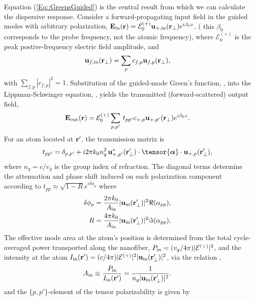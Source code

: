\documentclass[preprint,aps,pra,onecolumn]{revtex4-1} %
\newcommand{\inp}{{\rm in}}
\newcommand{\out}{{\rm out}}
\newcommand{\change}[1]{{\color{RoyalBlue} #1}}
\newcommand{\comment}[1]{{\color{Maroon} #1}}
\begin{document}
Equation (\ref{Eq::GreensGuided}) is the central result from which we can calculate the dispersive response.  
Consider a forward-propagating input field in the guided modes with arbitrary polarization, $\mathbf{E}_{\inp}(\br) = \mathcal{E}^{(+)}_0 \mathbf{u}_{+,\rm in}(\br_\perp) e^{i \beta_0 z}$, (\comment{this $\beta_0$ corresponds to the probe frequency, not the atomic frequency}), where $\mathcal{E}^{(+)}_0$ is the peak postive-frequency electric field amplitude, and  
	\begin{align}
		\mathbf{u}_{f,\rm in}(\mathbf{r}_\perp) = \sum_{p} c_{f,p} \mathbf{u}_{f,p}(\mathbf{r}_\perp),
	\end{align}
with $\sum_{f,p} |c_{f,p}|^2 = 1$.  Substitution of the guided-mode Green's function, , into the Lippman-Schwinger equation, , yields the transmitted (forward-scattered) output field, 
	\begin{equation}
		\mathbf{E}_{\out}(\br) =  \mathcal{E}^{(+)}_0 \sum_{p,p'}  \, t_{pp'} c_{+,p} \mathbf{u}_{+, p'}(\br_\perp) e^{i \beta_0 z}. 
	\end{equation}
For an atom located at $\mathbf{r}'$, the transmission matrix is \change{
\begin{equation} \label{Eq::PolarizationTransformation}
t_{pp'} = \delta_{p,p'} + i 2\pi k_0 n_g^2 \, \mathbf{u}^*_{+, p'}(\br'_\perp) \cdot 
\tensor{\boldsymbol{\alpha}} \cdot \mathbf{u}_{+, p}(\br'_\perp) ,
\end{equation}
where $n_g = c/v_g$ is the group index of refraction.  }The diagonal terms determine the attenuation and phase shift induced on each polarization component 
according to $t_{p p} \approx \sqrt{1-R}e^{i \delta \phi_p}$ where
	\begin{align}
		\delta \phi_p &= \frac{2 \pi k_0}{A_{\rm in}} |\mathbf{u}_{\rm in}(\mathbf{r}'_\perp)|^{2} \Re(\alpha_{pp}) , \label{Eq::PhaseShift} \\
		R &=  \frac{4 \pi k_0}{A_{\rm in}} |\mathbf{u}_{\rm in}(\mathbf{r}'_\perp)|^{2} \Im(\alpha_{pp}) , \label{Eq::Attenuation}
	\end{align}
\change{The effective mode area at the atom's position is determined from the total cycle-averaged power transported along the nanofiber, $P_{\rm in} = (v_g/4\pi) |\mathcal{E}^{(+)}|^2$, and the intensity at the atom $I_{\rm in}(\mathbf{r}') = (c/4\pi)|\mathcal{E}^{(+)}|^2|\mathbf{u}_{\rm in}(\mathbf{r}_\perp')|^2$, via the relation \cite{domokos_quantum_2002},
 	\begin{align} \label{Eq::AreaIn}
 		A_{\rm in} \equiv \frac{P_{\rm in}}{I_{\rm in}(\mathbf{r}')} = \frac{1}{n_g |\mathbf{u}_{\rm in}(\mathbf{r}'_\perp)|^{2}}.
	\end{align}
and the $\{p,p'\}$-element of the tensor polarizability is given by }
\end{document}

